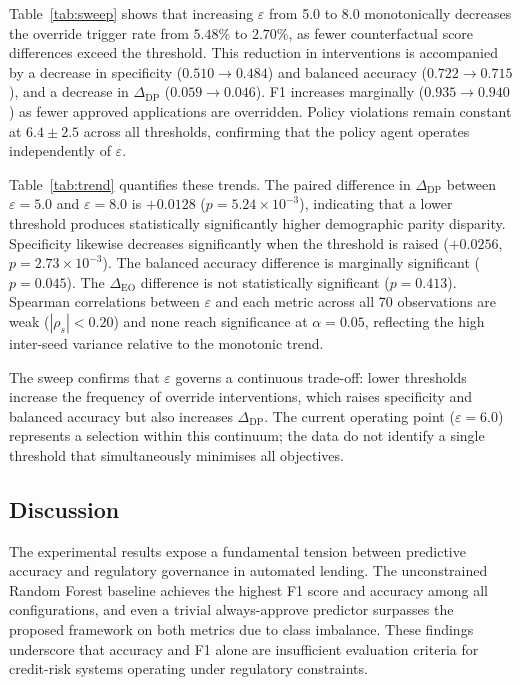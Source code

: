 Table~\ref{tab:sweep} shows that increasing $\varepsilon$ from 5.0 to 8.0
monotonically decreases the override trigger rate from $5.48\%$ to $2.70\%$,
as fewer counterfactual score differences exceed the threshold. This
reduction in interventions is accompanied by a decrease in specificity
($0.510 \to 0.484$) and balanced accuracy ($0.722 \to 0.715$), and
a decrease in $\Delta_{\text{DP}}$ ($0.059 \to 0.046$). F1 increases
marginally ($0.935 \to 0.940$) as fewer approved applications are
overridden. Policy violations remain constant at $6.4 \pm 2.5$ across all
thresholds, confirming that the policy agent operates independently of
$\varepsilon$.

Table~\ref{tab:trend} quantifies these trends. The paired difference in
$\Delta_{\text{DP}}$ between $\varepsilon = 5.0$ and $\varepsilon = 8.0$ is
$+0.0128$ ($p = 5.24 \times 10^{-3}$), indicating that a lower threshold
produces statistically significantly higher demographic parity disparity.
Specificity likewise decreases significantly when the threshold is raised
($+0.0256$, $p = 2.73 \times 10^{-3}$). The balanced accuracy difference is
marginally significant ($p = 0.045$). The $\Delta_{\text{EO}}$ difference is
not statistically significant ($p = 0.413$). Spearman correlations between
$\varepsilon$ and each metric across all 70 observations are weak
($|\rho_s| < 0.20$) and none reach significance at $\alpha = 0.05$,
reflecting the high inter-seed variance relative to the monotonic trend.

The sweep confirms that $\varepsilon$ governs a continuous trade-off:
lower thresholds increase the frequency of override interventions, which
raises specificity and balanced accuracy but also increases
$\Delta_{\text{DP}}$. The current operating point ($\varepsilon = 6.0$)
represents a selection within this continuum; the data do not identify a
single threshold that simultaneously minimises all objectives.

\subsection{Discussion}

The experimental results expose a fundamental tension between predictive
accuracy and regulatory governance in automated lending. The unconstrained
Random Forest baseline achieves the highest F1 score and accuracy among all
configurations, and even a trivial always-approve predictor surpasses the
proposed framework on both metrics due to class imbalance. These findings
underscore that accuracy and F1 alone are insufficient evaluation criteria
for credit-risk systems operating under regulatory constraints.

